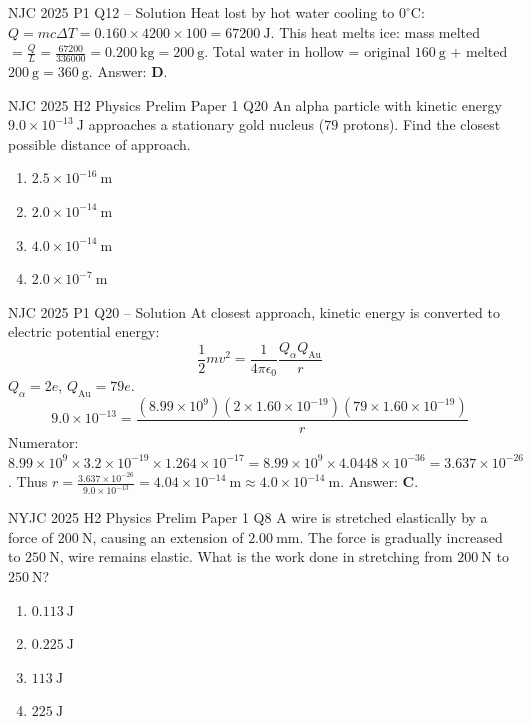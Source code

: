 \documentclass[11pt]{beamer}
\begin{document}
\begin{frame}{NJC 2025 P1 Q12 – Solution}
Heat lost by hot water cooling to $0^\circ\mathrm{C}$: $Q = mc\Delta T = 0.160\times4200\times100 = 67200\ \mathrm{J}$.
This heat melts ice: mass melted $= \frac{Q}{L} = \frac{67200}{336000} = 0.200\ \mathrm{kg} = 200\ \mathrm{g}$.
Total water in hollow = original $160\ \mathrm{g}$ + melted $200\ \mathrm{g} = 360\ \mathrm{g}$.
Answer: \textbf{D}.
\end{frame}

\begin{frame}[shrink=15]{NJC 2025 H2 Physics Prelim Paper 1 Q20}
An alpha particle with kinetic energy $9.0\times10^{-13}\ \mathrm{J}$ approaches a stationary gold nucleus ($79$ protons). Find the closest possible distance of approach.
\begin{enumerate}[A]
    \item $2.5\times10^{-16}\ \mathrm{m}$
    \item $2.0\times10^{-14}\ \mathrm{m}$
    \item $4.0\times10^{-14}\ \mathrm{m}$
    \item $2.0\times10^{-7}\ \mathrm{m}$
\end{enumerate}
\end{frame}

\begin{frame}{NJC 2025 P1 Q20 – Solution}
At closest approach, kinetic energy is converted to electric potential energy:
\[ \frac12 m v^2 = \frac{1}{4\pi\epsilon_0}\frac{Q_{\alpha} Q_{\text{Au}}}{r} \]
$Q_{\alpha} = 2e$, $Q_{\text{Au}} = 79e$.
\[ 9.0\times10^{-13} = \frac{(8.99\times10^9)(2\times1.60\times10^{-19})(79\times1.60\times10^{-19})}{r} \]
Numerator: $8.99\times10^9 \times 3.2\times10^{-19} \times 1.264\times10^{-17} = 8.99\times10^9 \times 4.0448\times10^{-36} = 3.637\times10^{-26}$.
Thus $r = \frac{3.637\times10^{-26}}{9.0\times10^{-13}} = 4.04\times10^{-14}\ \mathrm{m} \approx 4.0\times10^{-14}\ \mathrm{m}$.
Answer: \textbf{C}.
\end{frame}

\begin{frame}[shrink=15]{NYJC 2025 H2 Physics Prelim Paper 1 Q8}
A wire is stretched elastically by a force of $200\ \mathrm{N}$, causing an extension of $2.00\ \mathrm{mm}$. The force is gradually increased to $250\ \mathrm{N}$, wire remains elastic. What is the work done in stretching from $200\ \mathrm{N}$ to $250\ \mathrm{N}$?
\begin{enumerate}[A]
    \item $0.113\ \mathrm{J}$
    \item $0.225\ \mathrm{J}$
    \item $113\ \mathrm{J}$
    \item $225\ \mathrm{J}$
\end{enumerate}
\end{frame}
\end{document}
